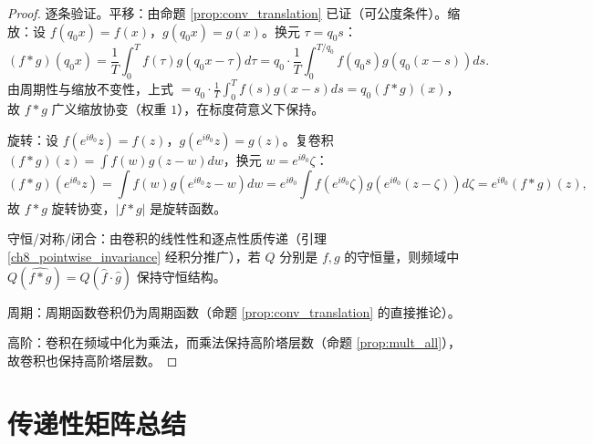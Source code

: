 \begin{proof}
逐条验证。平移：由命题 \ref{prop:conv_translation} 已证（可公度条件）。缩放：设 $f(q_0x)=f(x)$，$g(q_0x)=g(x)$。换元 $\tau=q_0s$：
\[
(f*g)(q_0x)=\frac{1}{T}\int_0^T f(\tau)g(q_0x-\tau)d\tau
=q_0\cdot\frac{1}{T}\int_0^{T/q_0}f(q_0s)g(q_0(x-s))ds.
\]
由周期性与缩放不变性，上式 $=q_0\cdot\frac{1}{T}\int_0^T f(s)g(x-s)ds=q_0(f*g)(x)$，故 $f*g$ 广义缩放协变（权重 $1$），在标度荷意义下保持。

旋转：设 $f(e^{i\theta_0}z)=f(z)$，$g(e^{i\theta_0}z)=g(z)$。复卷积 $(f*g)(z)=\int f(w)g(z-w)dw$，换元 $w=e^{i\theta_0}\zeta$：
\[
(f*g)(e^{i\theta_0}z)=\int f(w)g(e^{i\theta_0}z-w)dw
=e^{i\theta_0}\int f(e^{i\theta_0}\zeta)g(e^{i\theta_0}(z-\zeta))d\zeta
=e^{i\theta_0}(f*g)(z),
\]
故 $f*g$ 旋转协变，$|f*g|$ 是旋转函数。

守恒/对称/闭合：由卷积的线性性和逐点性质传递（引理 \ref{ch8_pointwise_invariance} 经积分推广），若 $Q$ 分别是 $f,g$ 的守恒量，则频域中 $Q(\widehat{f*g})=Q(\widehat f\cdot\widehat g)$ 保持守恒结构。

周期：周期函数卷积仍为周期函数（命题 \ref{prop:conv_translation} 的直接推论）。

高阶：卷积在频域中化为乘法，而乘法保持高阶塔层数（命题 \ref{prop:mult_all}），故卷积也保持高阶塔层数。
\end{proof}

\section{\texorpdfstring{传递性矩阵总结}{传递性矩阵总结}}

